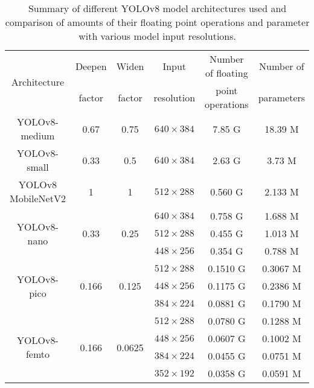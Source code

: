 \begin{table}[h]
\centering
\small
\begin{tabular}{|c|c|c|c|c|c|}
    \hline
    \multirow{2}{*}{Architecture}& Deepen                 & Widen                   & Input      & Number of floating & Number of \\
                                 & factor                 & factor                  & resolution & point operations   & parameters \\
    \hline
    \hline
    YOLOv8-medium                & 0.67                   & 0.75                    & $640 \times 384$ & 7.85 G & 18.39 M \\
    \hline
    YOLOv8-small                 & 0.33                   & 0.5                     & $640 \times 384$ & 2.63 G & 3.73 M \\
    \hline
    YOLOv8 MobileNetV2           & 1                      & 1                       & $512 \times 288$ & 0.560 G & 2.133 M \\
    \hline
    \multirow{3}{*}{YOLOv8-nano} & \multirow{3}{*}{0.33}  & \multirow{3}{*}{0.25}   & $640 \times 384$ & 0.758 G & 1.688 M \\
                                 &                        &                         & $512 \times 288$ & 0.455 G & 1.013 M \\
                                 &                        &                         & $448 \times 256$ & 0.354 G & 0.788 M \\
    \hline
    \multirow{3}{*}{YOLOv8-pico} & \multirow{3}{*}{0.166} & \multirow{3}{*}{0.125}  & $512 \times 288$ & 0.1510 G & 0.3067 M \\
                                 &                        &                         & $448 \times 256$ & 0.1175 G & 0.2386 M \\
                                 &                        &                         & $384 \times 224$ & 0.0881 G & 0.1790 M \\
    \hline
    \multirow{4}{*}{YOLOv8-femto}& \multirow{4}{*}{0.166} & \multirow{4}{*}{0.0625} & $512 \times 288$ & 0.0780 G & 0.1288 M \\
                                 &                        &                         & $448 \times 256$ & 0.0607 G & 0.1002 M \\
                                 &                        &                         & $384 \times 224$ & 0.0455 G & 0.0751 M \\
                                 &                        &                         & $352 \times 192$ & 0.0358 G & 0.0591 M \\
    \hline
\end{tabular}
\caption{Summary of different YOLOv8 model architectures used and comparison of amounts of their floating point operations and parameter with various model input resolutions.}
\label{ModelArchitectures}
\end{table}


